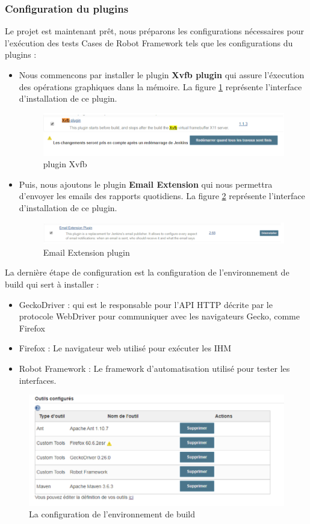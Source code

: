 \subsubsection{Configuration du plugins}
Le projet est maintenant prêt, nous préparons les configurations nécessaires pour l'exécution des tests Cases de Robot Framework tels que les configurations du plugins :
\begin{itemize}
	\item Nous commencons par installer le plugin \textbf{Xvfb plugin} qui assure l'éxecution des opérations graphiques dans la mémoire. La figure \ref{fig:xvfb} représente l'interface d'installation de ce plugin.
	\begin{figure}[H]
		\centering
		\includegraphics[width=0.9\linewidth]{img/jenkins/xvfb}
		\caption[plugin Xvfb]{plugin Xvfb}
		\label{fig:xvfb}
	\end{figure}
	
	\item Puis, nous ajoutons le plugin \textbf{Email Extension} qui nous permettra d'envoyer les emails des rapports quotidiens. La figure \ref{fig:email} représente l'interface d'installation de ce plugin.
	\begin{figure}[H]
		\centering
		\includegraphics[width=0.9\linewidth]{img/jenkins/email}
		\caption[Email Extension plugin]{Email Extension plugin}
		\label{fig:email}
	\end{figure}
	
\end{itemize}
La dernière étape de configuration est la configuration de l'environnement de build qui sert à installer :
\begin{itemize}
	\item GeckoDriver : qui est le responsable pour l'API HTTP décrite par le protocole WebDriver pour communiquer avec les navigateurs Gecko, comme Firefox
	\item Firefox : Le navigateur web utilisé pour exécuter les IHM
	\item Robot Framework : Le framework d'automatisation utilisé pour tester les interfaces.
\end{itemize}
\begin{figure}[H]
	\centering
	\includegraphics[width=0.7\linewidth]{img/jenkins/env-build}
	\caption[La configuration de l'environnement de build]{La configuration de l'environnement de build}
	\label{fig:env-build}
\end{figure}

